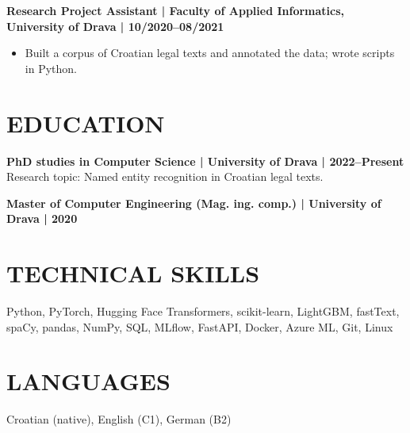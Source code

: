 \documentclass[11pt,a4paper]{article}
\begin{document}
\textbf{Research Project Assistant | Faculty of Applied Informatics, University of Drava | 10/2020–08/2021}
\begin{itemize}
\item Built a corpus of Croatian legal texts and annotated the data; wrote scripts in Python.
\end{itemize}

\section*{EDUCATION}
\textbf{PhD studies in Computer Science | University of Drava | 2022–Present}\\
Research topic: Named entity recognition in Croatian legal texts.\par\vspace{0.5em}
\textbf{Master of Computer Engineering (Mag. ing. comp.) | University of Drava | 2020}

\section*{TECHNICAL SKILLS}
Python, PyTorch, Hugging Face Transformers, scikit-learn, LightGBM, fastText, spaCy, pandas, NumPy, SQL, MLflow, FastAPI, Docker, Azure ML, Git, Linux

\section*{LANGUAGES}
Croatian (native), English (C1), German (B2)
\end{document}
